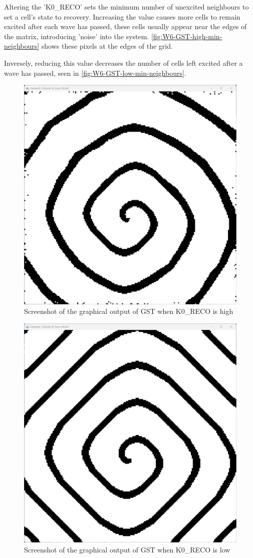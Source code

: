 Altering the 'K0\_RECO' sets the minimum number of unexcited neighbours to set a cell's state to recovery. Increasing the value causes more cells to remain excited after each wave has passed, these cells usually appear near the edges of the matrix, introducing 'noise' into the system. \autoref{fig:W6-GST-high-min-neighbours} shows these pixels at the edges of the grid.


Inversely, reducing this value decreases the number of cells left excited after a wave has passed, seen in \autoref{fig:W6-GST-low-min-neighbours}.
\begin{figure}[H] 
    \centering
    \includegraphics[width=0.49\columnwidth]{Figures/Week 6/GST-high-min-neighbours.png}
    \caption{Screenshot of the graphical output of GST when K0\_RECO is high}
    \label{fig:W6-GST-high-min-neighbours}
\end{figure}

\begin{figure}[H] 
    \centering
    \includegraphics[width=0.49\columnwidth]{Figures/Week 6/GST-low-min-neighbours.png}
    \caption{Screenshot of the graphical output of GST when K0\_RECO is low}
    \label{fig:W6-GST-low-min-neighbours}
\end{figure}

